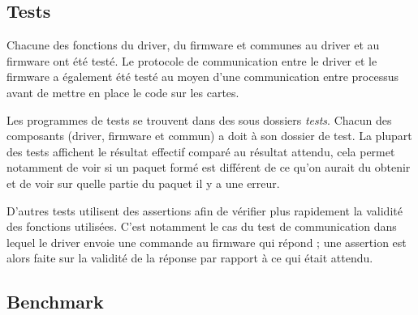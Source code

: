 \subsection{Tests}

Chacune des fonctions du driver, du firmware et communes au driver et au
firmware ont été testé. Le protocole de communication entre le driver et le
firmware a également été testé au moyen d'une communication entre processus
avant de mettre en place le code sur les cartes.

Les programmes de tests se trouvent dans des sous dossiers \emph{tests}.
Chacun des composants (driver, firmware et commun) a doit à son dossier de
test. La plupart des tests affichent le résultat effectif comparé au résultat
attendu, cela permet notamment de voir si un paquet formé est différent de ce
qu'on aurait du obtenir et de voir sur quelle partie du paquet il y a une
erreur.

D'autres tests utilisent des assertions afin de vérifier plus rapidement la
validité des fonctions utilisées. C'est notamment le cas du test de
communication dans lequel le driver envoie une commande au firmware qui
répond ; une assertion est alors faite sur la validité de la réponse par
rapport à ce qui était attendu.

\subsection{Benchmark}


